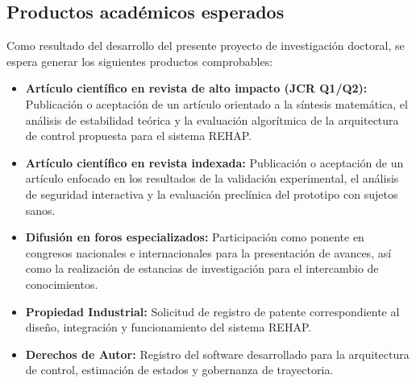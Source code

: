 \documentclass[a4paper,12pt]{article}
\begin{document}
\subsection{Productos académicos esperados}
Como resultado del desarrollo del presente proyecto de investigación doctoral, se espera generar los siguientes productos comprobables:
\begin{itemize}
    \item \textbf{Artículo científico en revista de alto impacto (JCR Q1/Q2):} Publicación o aceptación de un artículo orientado a la síntesis matemática, el análisis de estabilidad teórica y la evaluación algorítmica de la arquitectura de control propuesta para el sistema REHAP.
    \item \textbf{Artículo científico en revista indexada:} Publicación o aceptación de un artículo enfocado en los resultados de la validación experimental, el análisis de seguridad interactiva y la evaluación preclínica del prototipo con sujetos sanos.
    \item \textbf{Difusión en foros especializados:} Participación como ponente en congresos nacionales e internacionales para la presentación de avances, así como la realización de estancias de investigación para el intercambio de conocimientos.
    \item \textbf{Propiedad Industrial:} Solicitud de registro de patente correspondiente al diseño, integración y funcionamiento del sistema REHAP.
    \item \textbf{Derechos de Autor:} Registro del software desarrollado para la arquitectura de control, estimación de estados y gobernanza de trayectoria.
\end{itemize}
\end{document}
